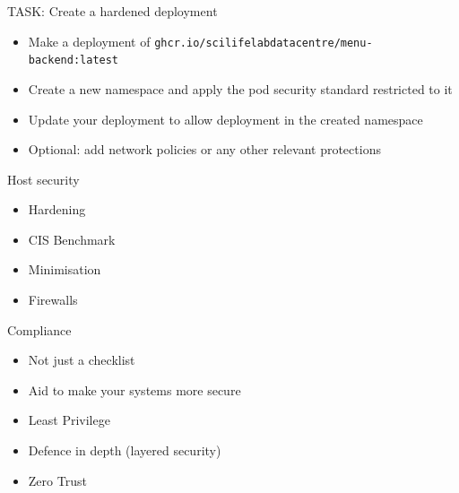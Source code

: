 \documentclass{dcpresentation}
\begin{document}
\begin{frame}{TASK: Create a hardened deployment}
  \begin{itemize}
  \item Make a deployment of \texttt{ghcr.io/scilifelabdatacentre/menu-backend:latest}
  \item Create a new namespace and apply the pod security standard restricted to it
  \item Update your deployment to allow deployment in the created namespace
  \item Optional: add network policies or any other relevant protections
  \end{itemize}
\end{frame}


\begin{frame}{Host security}
  \begin{itemize}
  \item Hardening
  \item CIS Benchmark
  \item Minimisation
  \item Firewalls
  \end{itemize}
\end{frame}


\begin{frame}{Compliance}
  \begin{itemize}
  \item Not just a checklist
  \item Aid to make your systems more secure 
  \end{itemize}
\end{frame}

\begin{frame}
  \begin{itemize}
  \item Least Privilege
  \item Defence in depth (layered security)
  \item Zero Trust
  \end{itemize}
\end{frame}
\end{document}
